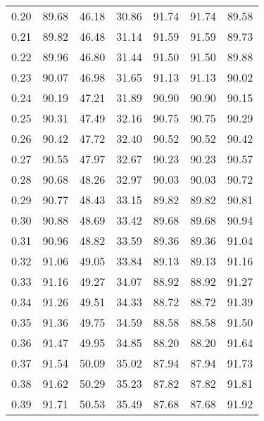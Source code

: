 \begin{tabular}{|c|c|c|c|c|c|c|}
      0.20 &     89.68 &     46.18 &      30.86 &   91.74 &      91.74 &         89.58 \\
      0.21 &     89.82 &     46.48 &      31.14 &   91.59 &      91.59 &         89.73 \\
      0.22 &     89.96 &     46.80 &      31.44 &   91.50 &      91.50 &         89.88 \\
      0.23 &     90.07 &     46.98 &      31.65 &   91.13 &      91.13 &         90.02 \\
      0.24 &     90.19 &     47.21 &      31.89 &   90.90 &      90.90 &         90.15 \\
      0.25 &     90.31 &     47.49 &      32.16 &   90.75 &      90.75 &         90.29 \\
      0.26 &     90.42 &     47.72 &      32.40 &   90.52 &      90.52 &         90.42 \\
      0.27 &     90.55 &     47.97 &      32.67 &   90.23 &      90.23 &         90.57 \\
      0.28 &     90.68 &     48.26 &      32.97 &   90.03 &      90.03 &         90.72 \\
      0.29 &     90.77 &     48.43 &      33.15 &   89.82 &      89.82 &         90.81 \\
      0.30 &     90.88 &     48.69 &      33.42 &   89.68 &      89.68 &         90.94 \\
      0.31 &     90.96 &     48.82 &      33.59 &   89.36 &      89.36 &         91.04 \\
      0.32 &     91.06 &     49.05 &      33.84 &   89.13 &      89.13 &         91.16 \\
      0.33 &     91.16 &     49.27 &      34.07 &   88.92 &      88.92 &         91.27 \\
      0.34 &     91.26 &     49.51 &      34.33 &   88.72 &      88.72 &         91.39 \\
      0.35 &     91.36 &     49.75 &      34.59 &   88.58 &      88.58 &         91.50 \\
      0.36 &     91.47 &     49.95 &      34.85 &   88.20 &      88.20 &         91.64 \\
      0.37 &     91.54 &     50.09 &      35.02 &   87.94 &      87.94 &         91.73 \\
      0.38 &     91.62 &     50.29 &      35.23 &   87.82 &      87.82 &         91.81 \\
      0.39 &     91.71 &     50.53 &      35.49 &   87.68 &      87.68 &         91.92 \\

\end{tabular}
